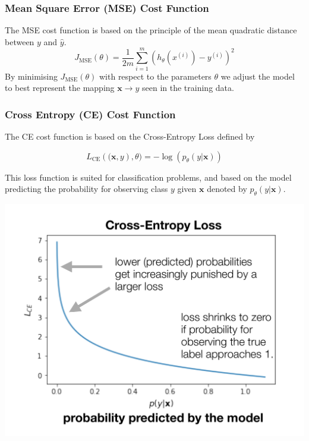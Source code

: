 \documentclass[11pt]{article}
\begin{document}
\subsubsection{Mean Square Error (MSE) Cost Function}
The MSE cost function is based on the principle of the mean quadratic distance between $y$ and $\hat{y}$.
\begin{equation}
	J_{\text{MSE}}(\theta) = \frac{1}{2m}\sum_{i=1}^{m}\left(h_\theta(x^{(i)})-y^{(i)}\right)^2
\end{equation}
\noindent
By minimising $J_{\text{MSE}}(\theta)$ with respect to the parameters $\theta$ we adjust the model to best represent the mapping $\textbf{x}\rightarrow y$ seen in the training data.

\subsubsection{Cross Entropy (CE) Cost Function}
The CE cost function is based on the Cross-Entropy Loss defined by

\begin{equation*}
	L_{\text{CE}}\left((\textbf{x},y\right),\theta) = -\log\left(p_\theta(y|\textbf{x})\right)
\end{equation*}

\noindent
\begin{minipage}[b]{0.5\linewidth}
	This loss function is suited for classification problems, and based on the model predicting the probability for observing class $y$ given $\textbf{x}$ denoted by $p_\theta(y|\textbf{x})$.
\end{minipage}
\begin{minipage}{0.5\linewidth}
	\centering
	\includegraphics[width=0.8\linewidth, keepaspectratio]{img/cross_entropy_loss}
\end{minipage}
\end{document}
